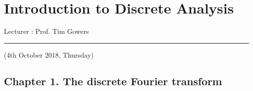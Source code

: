 \documentclass[12pt,a4paper]{report}
\DeclarePairedDelimiter\bignorm{\lVert}{\rVert}
\newcommand{\doublerule}[1][.4pt]{%
  \noindent
  \makebox[0pt][l]{\rule[.7ex]{\linewidth}{#1}}%
  \rule[.3ex]{\linewidth}{#1}}
\begin{document}
\newcommand{\thm}{\textbf{Theorem) }}
\newcommand{\thmnum}[1]{\textbf{Theorem #1) }}
\newcommand{\defi}{\textbf{Definition) }}
\newcommand{\lem}{\textbf{Lemma) }}
\newcommand{\lemnum}[1]{\textbf{Lemma #1) }}
\newcommand{\prop}{\textbf{Proposition) }}
\newcommand{\propnum}[1]{\textbf{Proposition #1) }}
\newcommand{\cor}{\textbf{Corollary) }}
\newcommand{\cornum}[1]{\textbf{Corollary #1) }}


\newcommand{\pf}{\textbf{proof) }}
\newcommand{\eop}{\hfill  \textsl{(End of proof)} $\square$} %


\newcommand{\lap}{\triangle} %
\newcommand{\s}{\vspace{10pt}}
\newcommand{\bull}{$\bullet$}
\newcommand{\sta}{$\star$}
\newcommand{\reals}{\mathbb{R}}

\newcommand{\intN}{\mathbb{Z}_N}
\newcommand{\norms}[2]{\bignorm[\big]{#1}_{#2}}
\newcommand{\avg}{\mathbb{E}}
\newcommand{\prob}{\mathbb{P}}
\newcommand{\osc}{\text{\osc}}

\renewcommand{\P}{\mathscr{P}}

\newcommand{\boxnorm}[1]{\norms{#1}{\tiny{\square}}}
\newcommand{\boxinn}[4]{\begin{array}{|cc|} 
\cline{1-2}
#1 & #2 \\
#3 & #4 \\
\cline{1-2}
\end{array}}

\newcommand{\newday}{\doublerule[0.5pt]}
\newcommand{\digression}{**********************************************************************************************}

\renewcommand{\bar}{\overline}

\setlength\parindent{0pt}

\chapter*{Introduction to Discrete Analysis}
\s

Lecturer : Prof. Tim Gowers
\s

\newday

(4th October 2018, Thursday)
\s

\section*{Chapter 1. The discrete Fourier transform}
\s
\end{document}
